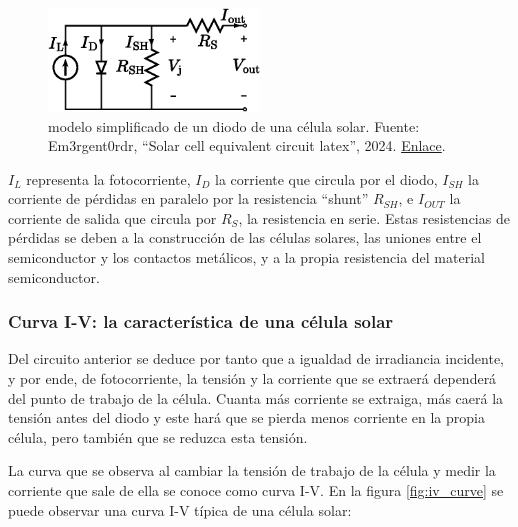 \begin{figure}[H]
      \centering
      \includegraphics[width=0.5\textwidth]{./images/SoA_irrad/Solar_cell_equivalent_circuit_latex.png}
      \caption{\Gls{modelo} simplificado de un \gls{diodo} de una \gls{célula solar}. Fuente: Em3rgent0rdr, ``Solar cell equivalent circuit latex'', 2024. \href{https://commons.wikimedia.org/w/index.php?curid=149538519}{Enlace}.}
      \label{fig:solar_cell_model}
\end{figure}

$I_L$ representa la fotocorriente, $I_D$ la corriente que circula por el \gls{diodo}, $I_{SH}$ la corriente de pérdidas en paralelo por la resistencia ``\gls{shunt}'' $R_{SH}$, e $I_{OUT}$ la corriente de salida que circula por $R_{S}$, la resistencia en serie. Estas resistencias de pérdidas se deben a la construcción de las células solares, las uniones entre el \gls{semiconductor} y los contactos metálicos, y a la propia resistencia del material \gls{semiconductor}.

\subsubsection{Curva I-V: la característica de una célula solar}

Del circuito anterior se deduce por tanto que a igualdad de \gls{irradiancia} incidente, y por ende, de fotocorriente, la tensión y la corriente que se extraerá dependerá del punto de trabajo de la célula. Cuanta más corriente se extraiga, más caerá la tensión antes del \gls{diodo} y este hará que se pierda menos corriente en la propia célula, pero también que se reduzca esta tensión.

La curva que se observa al cambiar la tensión de trabajo de la célula y medir la corriente que sale de ella se conoce como \gls{curva I-V}. En la figura \ref{fig:iv_curve} se puede observar una curva I-V típica de una célula solar:

